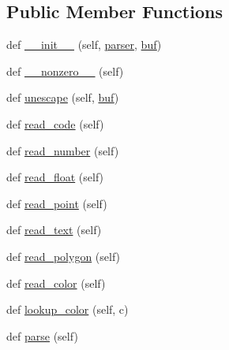 \subsection*{Public Member Functions}
\begin{DoxyCompactItemize}
\item 
def \hyperlink{classsmacc__viewer_1_1xdot_1_1xdot_1_1XDotAttrParser_ab02a1a45e1373e2770ffb9a0c207aac8}{\+\_\+\+\_\+init\+\_\+\+\_\+} (self, \hyperlink{classsmacc__viewer_1_1xdot_1_1xdot_1_1XDotAttrParser_a42de54e2236f0efd3c021fcef2e69b81}{parser}, \hyperlink{classsmacc__viewer_1_1xdot_1_1xdot_1_1XDotAttrParser_a40fb437711b231cb2d0fed77106edc2f}{buf})
\item 
def \hyperlink{classsmacc__viewer_1_1xdot_1_1xdot_1_1XDotAttrParser_a304338bbbbc630a8bd7de050c2d7d7be}{\+\_\+\+\_\+nonzero\+\_\+\+\_\+} (self)
\item 
def \hyperlink{classsmacc__viewer_1_1xdot_1_1xdot_1_1XDotAttrParser_af2218c053933d95e30d6d6e1b876e078}{unescape} (self, \hyperlink{classsmacc__viewer_1_1xdot_1_1xdot_1_1XDotAttrParser_a40fb437711b231cb2d0fed77106edc2f}{buf})
\item 
def \hyperlink{classsmacc__viewer_1_1xdot_1_1xdot_1_1XDotAttrParser_a81a7b9dbeee376b4c1043bf3aac31c0c}{read\+\_\+code} (self)
\item 
def \hyperlink{classsmacc__viewer_1_1xdot_1_1xdot_1_1XDotAttrParser_a3cd5d75659572a2deec8a81b677eb9ab}{read\+\_\+number} (self)
\item 
def \hyperlink{classsmacc__viewer_1_1xdot_1_1xdot_1_1XDotAttrParser_ad4f86cafc08ff05d6f1e1bf7597a5ed0}{read\+\_\+float} (self)
\item 
def \hyperlink{classsmacc__viewer_1_1xdot_1_1xdot_1_1XDotAttrParser_a27089e09a2955bbbeb569e0b0fb5255b}{read\+\_\+point} (self)
\item 
def \hyperlink{classsmacc__viewer_1_1xdot_1_1xdot_1_1XDotAttrParser_a1a80138dcda0594956369bb57b3ff45e}{read\+\_\+text} (self)
\item 
def \hyperlink{classsmacc__viewer_1_1xdot_1_1xdot_1_1XDotAttrParser_a774bf50ffffa78965193d06e22a81f98}{read\+\_\+polygon} (self)
\item 
def \hyperlink{classsmacc__viewer_1_1xdot_1_1xdot_1_1XDotAttrParser_aaab8ac2a3d40590ec63467dc09a9cd9f}{read\+\_\+color} (self)
\item 
def \hyperlink{classsmacc__viewer_1_1xdot_1_1xdot_1_1XDotAttrParser_a96f9cb64a54ebdd51f44a82785c1bafe}{lookup\+\_\+color} (self, c)
\item 
def \hyperlink{classsmacc__viewer_1_1xdot_1_1xdot_1_1XDotAttrParser_a6b15376dc51b551cca99eefc04001a0a}{parse} (self)

\end{DoxyCompactItemize}
